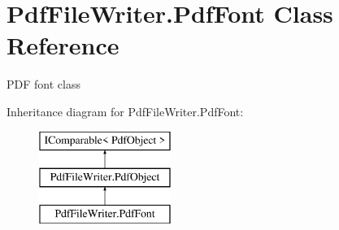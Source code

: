 \hypertarget{class_pdf_file_writer_1_1_pdf_font}{}\section{Pdf\+File\+Writer.\+Pdf\+Font Class Reference}
\label{class_pdf_file_writer_1_1_pdf_font}


P\+DF font class  


Inheritance diagram for Pdf\+File\+Writer.\+Pdf\+Font\+:\begin{figure}[H]
\begin{center}
\leavevmode
\includegraphics[height=3.000000cm]{class_pdf_file_writer_1_1_pdf_font}
\end{center}
\end{figure}

